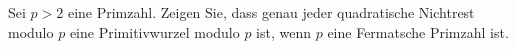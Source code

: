 
\begin{exercise}

Sei $p > 2$ eine Primzahl. Zeigen Sie, dass genau jeder quadratische
Nichtrest modulo $p$ eine Primitivwurzel modulo $p$ ist, wenn $p$ eine
Fermatsche Primzahl ist.
\end{exercise}


\begin{solution}

\phantom{}

\end{solution}

